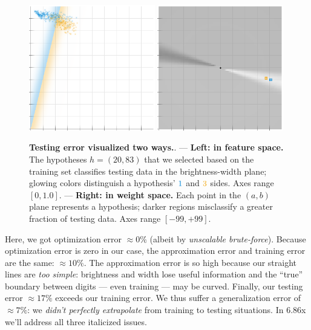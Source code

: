   \begin{figure}[h]
      \centering
      \includegraphics[width=0.49\textwidth]{example-mnist/test-features.png}%
      \includegraphics[width=0.49\textwidth]{example-mnist/test-weights.png}%
      \caption{
          \textbf{Testing error visualized two ways.}.
        --- %
        \textbf{Left: in feature space.}
        The hypotheses $h=(20, 83)$ that we selected based on the training set
        classifies testing data in the brightness-width plane; glowing colors
        distinguish a hypothesis' $\blu{1}$ and $\rng{3}$ sides.
        Axes range $[0, 1.0]$.
        --- %
        \textbf{Right: in weight space.}
        Each point in the $(a,b)$ plane
        represents a hypothesis; darker regions misclassify a greater
        fraction of testing data.  Axes range $[-99,+99]$.
      }
      \label{fig:test-features-weights}
  \end{figure}

  Here, we got optimization error $\approx 0\%$ (albeit by
  \emph{unscalable brute-force}).  Because optimization error is zero in
  our case, the approximation error and training error are the same:
  $\approx10\%$.  The approximation error is so high because our straight
  lines are \emph{too simple}: brightness and width lose useful
  information and the ``true'' boundary between digits --- even training ---
  may be curved.
  Finally, our testing error $\approx 17\%$ exceeds our training error.
  We thus suffer a generalization error of $\approx 7\%$: we \emph{didn't
  perfectly extrapolate} from training to testing situations.
  In 6.86x we'll address all three italicized issues.


